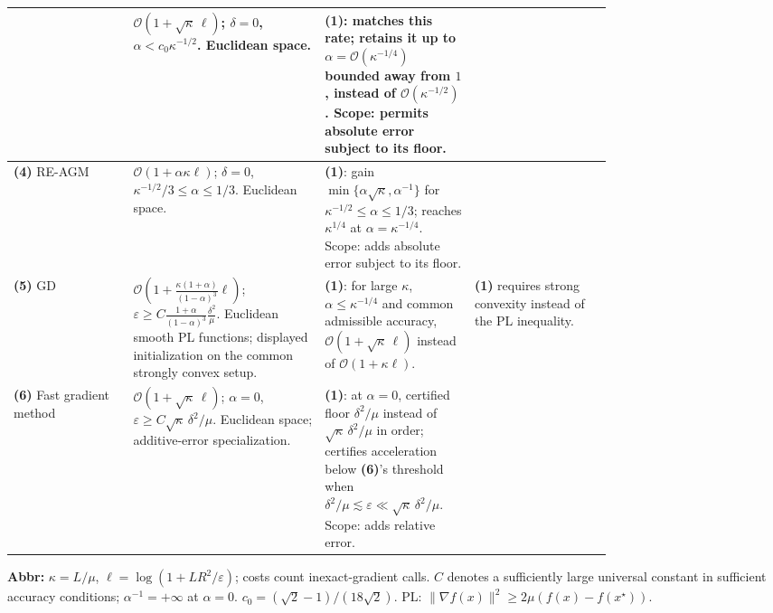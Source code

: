 \begin{table}[tp]
\begin{threeparttable}
\begin{tabularx}{\linewidth}{@{}>{\raggedright\arraybackslash}p{0.20\linewidth}>{\raggedright\arraybackslash}p{0.32\linewidth}>{\raggedright\arraybackslash}p{0.25\linewidth}>{\raggedright\arraybackslash}X@{}}
& $\mathcal{O}(1+\sqrt\kappa\,\ell)$; $\delta=0$, $\alpha<c_0\kappa^{-1/2}$. Euclidean space.
& \textbf{(1)}: matches this rate; retains it up to $\alpha=\mathcal{O}(\kappa^{-1/4})$ bounded away from $1$, instead of $\mathcal{O}(\kappa^{-1/2})$. Scope: permits absolute error subject to its floor.
& \\
\midrule
\textbf{(4)} RE-AGM \citep[Thm.~5]{igsVasinEtAl2025v3}
& $\mathcal{O}(1+\alpha\kappa\ell)$; $\delta=0$, $\kappa^{-1/2}/3\le\alpha\le1/3$. Euclidean space.
& \textbf{(1)}: gain $\min\{\alpha\sqrt\kappa,\alpha^{-1}\}$ for $\kappa^{-1/2}\le\alpha\le1/3$; reaches $\kappa^{1/4}$ at $\alpha=\kappa^{-1/4}$. Scope: adds absolute error subject to its floor.
& \\
\midrule
\textbf{(5)} GD \citep[Thm.~5.2]{igsVasinGasnikov2026v1}
& $\mathcal{O}\!\left(1+\frac{\kappa(1+\alpha)}{(1-\alpha)^3}\ell\right)$; $\varepsilon\ge C\frac{1+\alpha}{(1-\alpha)^3}\frac{\delta^2}{\mu}$. Euclidean smooth PL functions; displayed initialization on the common strongly convex setup.
& \textbf{(1)}: for large $\kappa$, $\alpha\le\kappa^{-1/4}$ and common admissible accuracy, $\mathcal{O}(1+\sqrt\kappa\,\ell)$ instead of $\mathcal{O}(1+\kappa\ell)$.
& \textbf{(1)} requires strong convexity instead of the PL inequality. \\
\midrule
\textbf{(6)} Fast gradient method \citep[Thm.~3.3]{igsGaucherEtAl2026v1}
& $\mathcal{O}(1+\sqrt\kappa\,\ell)$; $\alpha=0$, $\varepsilon\ge C\sqrt\kappa\,\delta^2/\mu$. Euclidean space; additive-error specialization.
& \textbf{(1)}: at $\alpha=0$, certified floor $\delta^2/\mu$ instead of $\sqrt\kappa\,\delta^2/\mu$ in order; certifies acceleration below \textbf{(6)}'s threshold when $\delta^2/\mu\lesssim\varepsilon\ll\sqrt\kappa\,\delta^2/\mu$. Scope: adds relative error.
& \\
\bottomrule
\end{tabularx}
\begin{tablenotes}[flushleft]\footnotesize
\item[] \textbf{Abbr:} $\kappa=L/\mu$, $\ell=\log(1+LR^2/\varepsilon)$; costs count inexact-gradient calls. $C$ denotes a sufficiently large universal constant in sufficient accuracy conditions; $\alpha^{-1}=+\infty$ at $\alpha=0$. $c_0=(\sqrt2-1)/(18\sqrt2)$. PL: $\|\nabla f(x)\|^2\ge2\mu(f(x)-f(x^\star))$.
\end{tablenotes}
\end{threeparttable}
\end{table}
\clearpage
